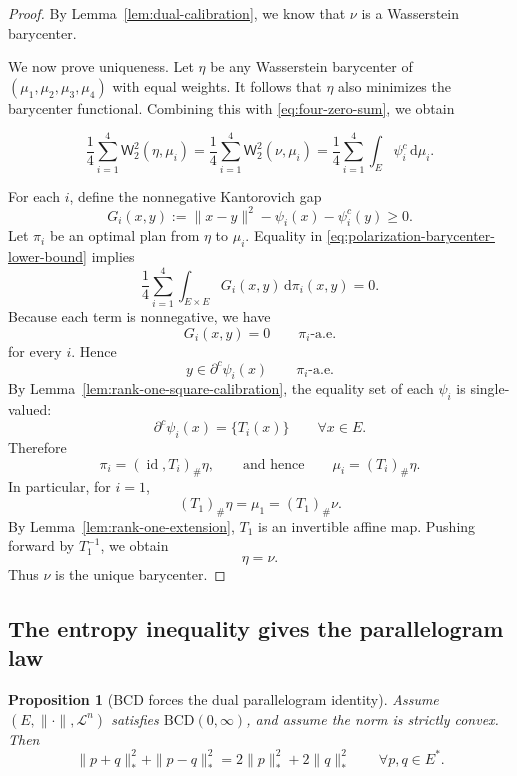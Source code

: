\documentclass[a4paper,11pt]{article}
\numberwithin{equation}{section}
\newtheorem{proposition}[theorem]{Proposition}
\newcommand{\id}{\operatorname{id}}
\newcommand{\dd}{\mathrm d}
\begin{document}
	\begin{proof}
		By Lemma~\ref{lem:dual-calibration}, we know that \(\nu\) is a Wasserstein barycenter. 
		
		We now prove uniqueness. Let \(\eta\) be any Wasserstein barycenter of
		\((\mu_1,\mu_2,\mu_3,\mu_4)\) with equal weights. It follows that 
		\(\eta\) also minimizes the barycenter functional. Combining this with \eqref{eq:four-zero-sum}, we obtain
		
		\begin{equation}\label{eq:polarization-barycenter-lower-bound}
			\frac14\sum_{i=1}^4 \mathsf W_2^2(\eta,\mu_i)
			=
			\frac14\sum_{i=1}^4 \mathsf W_2^2(\nu,\mu_i)
			=
			\frac14\sum_{i=1}^4\int_E\psi_i^c\,\dd\mu_i.
		\end{equation}
		
		For each \(i\), define the nonnegative Kantorovich gap
		\[
		G_i(x,y):=\|x-y\|^2-\psi_i(x)-\psi_i^c(y)\ge0.
		\]
		Let \(\pi_i\) be an optimal plan from \(\eta\) to \(\mu_i\). Equality in \eqref{eq:polarization-barycenter-lower-bound} implies
		\[
		\frac14\sum_{i=1}^4\int_{E\times E}G_i(x,y)\,\dd\pi_i(x,y)=0.
		\]
		Because each term is nonnegative, we have
		\[
		G_i(x,y)=0
		\qquad \pi_i\text{-a.e.}
		\]
		for every \(i\). Hence
		\[
		y\in\partial^c\psi_i(x)
		\qquad \pi_i\text{-a.e.}
		\]
		By Lemma~\ref{lem:rank-one-square-calibration}, the equality set of each
		\(\psi_i\) is single-valued:
		\[
		\partial^c\psi_i(x)=\{T_i(x)\}
		\qquad\forall x\in E.
		\]
		Therefore
		\[
		\pi_i=(\id,T_i)_\#\eta,
		\qquad\text{and hence}\qquad
		\mu_i=(T_i)_\#\eta.
		\]
		In particular, for \(i=1\),
		\[
		(T_1)_\#\eta=\mu_1=(T_1)_\#\nu.
		\]
		By Lemma~\ref{lem:rank-one-extension}, \(T_1\) is an invertible affine map.
		Pushing forward by \(T_1^{-1}\), we obtain
		\[
		\eta=\nu.
		\]
		Thus \(\nu\) is the unique barycenter.
	\end{proof}
	
	\subsection{The entropy inequality gives the parallelogram law}\label{subsec:entropy-parallelogram}
	
	\begin{proposition}[BCD forces the dual parallelogram identity]
		\label{prop:dual-parallelogram}
		Assume \((E,\|\cdot\|,\mathcal L^n)\) satisfies \(\mathrm{BCD}(0,\infty)\), and assume the norm is strictly convex. Then
		\begin{equation}\label{eq:dual-parallelogram}
			\|p+q\|_*^2+\|p-q\|_*^2
			=2\|p\|_*^2+2\|q\|_*^2
			\qquad\forall p,q\in E^*.
		\end{equation}
	\end{proposition}
	
\end{document}
